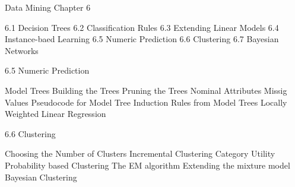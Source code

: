Data Mining Chapter 6

6.1 Decision Trees
6.2 Classification Rules
6.3 Extending Linear Models
6.4 Instance-baed Learning
6.5 Numeric Prediction
6.6 Clustering
6.7 Bayesian Networks

6.5 Numeric Prediction

Model Trees
Building the Trees
Pruning the Trees
Nominal Attributes
Missig Values
Pseudocode for Model Tree Induction
Rules from Model Trees
Locally Weighted Linear Regression

6.6 Clustering

Choosing the Number of Clusters
Incremental Clustering
Category Utility
Probability based Clustering
The EM algorithm
Extending the mixture model
Bayesian Clustering

